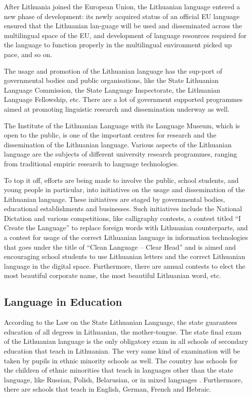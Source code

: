 \documentclass[]{../metanetpaper}
\begin{document}
\begin{multicols}{2}
    After Lithuania joined the European Union, the Lithuanian language entered a new phase of development: its newly acquired status of an official EU language ensured that the Lithuanian lan-guage will be used and disseminated across the multilingual space of the EU, and development of language resources required for the language to function properly in the multilingual environment picked up pace, and so on.

The usage and promotion of the Lithuanian language has the sup-port of governmental bodies and public organisations, like the State Lithuanian Language Commission, the State Language Inspectorate, the Lithuanian Language Fellowship, etc. There are a lot of government supported programmes aimed at promoting linguistic research and dissemination underway as well.

The Institute of the Lithuanian Language with its Language Museum, which is open to the public, is one of the important centres for research and the dissemination of the Lithuanian language. Various aspects of the Lithuanian language are the subjects of different university research programmes, ranging from traditional empiric research to language technologies.

To top it off, efforts are being made to involve the public, school students, and young people in particular, into initiatives on the usage and dissemination of the Lithuanian language. These initiatives are staged by governmental bodies, educational establishments and businesses. Such initiatives include the National Dictation and various competitions, like calligraphy contests, a contest titled “I Create the Language” to replace foreign words with Lithuanian counterparts, and a contest for usage of the correct Lithuanian language in information technologies that goes under the title of “Clean Language – Clear Head” and is aimed and encouraging school students to use Lithuanian letters and the correct Lithuanian language in the digital space. Furthermore, there are annual contests to elect the most beautiful corporate name, the most beautiful Lithuanian word, etc.

\subsection{Language in Education}

According to the Law on the State Lithuanian Language, the state guarantees education of all degrees in Lithuanian, the mother-tongue. The state final exam of the Lithuanian language is the only obligatory exam in all schools of secondary education that teach in Lithuanian. The very same kind of examination will be taken by pupils in ethnic minority schools as well. The country has schools for the children of ethnic minorities that teach in languages other than the state language, like Russian, Polish, Belarusian, or in mixed languages \cite{smm1}. Furthermore, there are schools that teach in English, German, French and Hebraic. 


\end{multicols}
\end{document}
